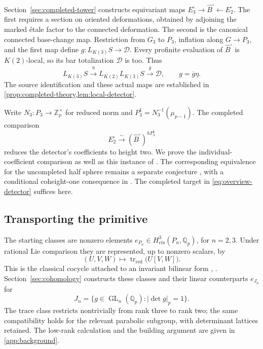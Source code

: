 \documentclass[11pt]{article}
\numberwithin{equation}{section}
\theoremstyle{definition}
\theoremstyle{remark}
\begin{document}
Section~\ref{sec:completed-tower} constructs equivariant maps
\(E_3^\square\to\widehat B^\square\leftarrow E_2^\square\).
The first requires a section on oriented deformations, obtained by
adjoining the marked \'etale factor to the connected deformation.
The second is the canonical connected base-change map. Restriction
from \(G_3\) to \(P_3\), inflation along \(G\to P_3\), and the first
map define \(g:L_{K(3)}S\to\mathcal D\). Every profinite evaluation
of \(\widehat B^\square\) is \(K(2)\)-local, so its bar totalization
\(\mathcal D\) is too. Thus
\begin{equation}\label{eq:overview-detector}
 L_{K(3)}S\xrightarrow{\eta}L_{K(2)}L_{K(3)}S
       \xrightarrow{\overline g}\mathcal D,
 \qquad g=\overline g\eta.
\end{equation}
The source identification and these actual maps are established in
\cref{prop:completed-theory,lem:local-detector}.

Write \(N_3:P_3\to\mathbb Z_p^\times\) for reduced norm and
\(P_3^1=N_3^{-1}(\mu_{p-1})\). The completed comparison
\[
 E_2^\square\xrightarrow{\sim}(\widehat B^\square)^{hP_3^1}
\]
reduces the detector's coefficients to height two. We prove the
individual-coefficient comparison as well as this instance of
\cite[Theorem~5.2.6]{BMR2026}. The corresponding equivalence for the
uncompleted half sphere remains a separate conjecture
\cite[Conjectures~1.1.1 and~5.1.13]{BMR2026}, with a conditional
coheight-one consequence in \cite[Proposition~5.1.17]{BMR2026}.
The completed target in \eqref{eq:overview-detector} suffices here.

\subsection{Transporting the primitive}

The starting classes are nonzero elements
\(e_{P_n}\in H^3_{\mathrm{cts}}(P_n,\mathbb Q_p)\), for \(n=2,3\).
Under rational Lie comparison they are represented, up to nonzero
scalars, by
\[
 (U,V,W)\longmapsto\operatorname{tr}_{\mathrm{red}}\bigl(U[V,W]\bigr).
\]
This is the classical cocycle attached to an invariant bilinear form
\cite[\S21]{ChevalleyEilenberg1948}, \cite[\S11]{Koszul1950}.
Section~\ref{sec:cohomology} constructs these classes and their linear
counterparts \(e_{J_n}\) for
\[
 J_n=\{g\in\operatorname{GL}_n(\mathbb Q_p):|\det g|_p=1\}.
\]
The trace class restricts nontrivially from rank three to rank two;
the same compatibility holds for the relevant parabolic subgroup,
with determinant lattices retained. The low-rank calculation and the building argument are given
in \cref{app:background}.
\end{document}
